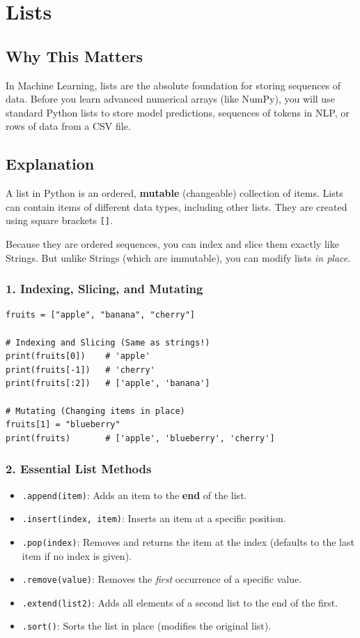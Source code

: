 \chapter{Lists}

\section{Why This Matters}
In Machine Learning, lists are the absolute foundation for storing sequences of data. Before you learn advanced numerical arrays (like NumPy), you will use standard Python lists to store model predictions, sequences of tokens in NLP, or rows of data from a CSV file.

\section{Explanation}
A list in Python is an ordered, \textbf{mutable} (changeable) collection of items. Lists can contain items of different data types, including other lists. They are created using square brackets \texttt{[]}.

Because they are ordered sequences, you can index and slice them exactly like Strings. But unlike Strings (which are immutable), you can modify lists \textit{in place}.

\subsection{1. Indexing, Slicing, and Mutating}
\begin{lstlisting}
fruits = ["apple", "banana", "cherry"]

# Indexing and Slicing (Same as strings!)
print(fruits[0])    # 'apple'
print(fruits[-1])   # 'cherry'
print(fruits[:2])   # ['apple', 'banana']

# Mutating (Changing items in place)
fruits[1] = "blueberry" 
print(fruits)       # ['apple', 'blueberry', 'cherry']
\end{lstlisting}

\subsection{2. Essential List Methods}
\begin{itemize}
    \item \texttt{.append(item)}: Adds an item to the \textbf{end} of the list.
    \item \texttt{.insert(index, item)}: Inserts an item at a specific position.
    \item \texttt{.pop(index)}: Removes and returns the item at the index (defaults to the last item if no index is given).
    \item \texttt{.remove(value)}: Removes the \textit{first} occurrence of a specific value.
    \item \texttt{.extend(list2)}: Adds all elements of a second list to the end of the first.
    \item \texttt{.sort()}: Sorts the list in place (modifies the original list).
\end{itemize}

